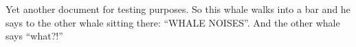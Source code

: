 \documentclass[a4paper]{article}
\begin{document}
Yet another document for testing purposes.
So this whale walks into a bar and he says to the other whale sitting there: ``WHALE NOISES''.
And the other whale says ``what?!''
\end{document}
